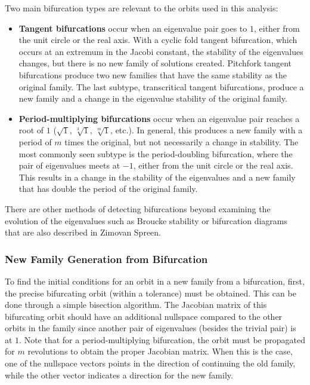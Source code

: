 Two main bifurcation types are relevant to the orbits used in this analysis:
\begin{itemize}
    \item \textbf{Tangent bifurcations} occur when an eigenvalue pair goes to $1$, either from the
    unit circle or the real axis. With a cyclic fold tangent bifurcation, which occurs at an
    extremum in the Jacobi constant, the stability of the eigenvalues changes, but there is no new
    family of solutions created. Pitchfork tangent bifurcations produce two new families that have
    the same stability as the original family. The last subtype, transcritical tangent
    bifurcations, produce a new family and a change in the eigenvalue stability of the original
    family.
    \item \textbf{Period-multiplying bifurcations} occur when an eigenvalue pair reaches a root of
    $1$ ($\sqrt{1}$, $\sqrt[3]{1}$, $\sqrt[m]{1}$, etc.). In general, this produces a new family
    with a period of $m$ times the original, but not necessarily a change in stability. The most
    commonly seen subtype is the period-doubling bifurcation, where the pair of eigenvalues meets
    at $-1$, either from the unit circle or the real axis. This results in a change in the
    stability of the eigenvalues and a new family that has double the period of the original
    family.
\end{itemize}
There are other methods of detecting bifurcations beyond examining the evolution of the eigenvalues
such as Broucke stability or bifurcation diagrams that are also described in Zimovan
Spreen\cite{ZimovanSpreen:2021}.

\subsubsection{New Family Generation from Bifurcation}
To find the initial conditions for an orbit in a new family from a bifurcation, first, the precise
bifurcating orbit (within a tolerance) must be obtained. This can be done through a simple
bisection algorithm. The Jacobian matrix of this bifurcating orbit should have an additional
nullspace compared to the other orbits in the family since another pair of eigenvalues (besides the
trivial pair) is at $1$. Note that for a period-multiplying bifurcation, the orbit must be
propagated for $m$ revolutions to obtain the proper Jacobian matrix. When this is the case, one of
the nullspace vectors points in the direction of continuing the old family, while the other vector
indicates a direction for the new family.

